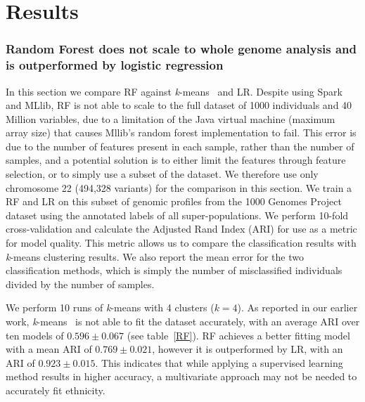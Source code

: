 \documentclass{llncs}
\newcommand{\kMeans}{\textit{k}-means }
\begin{document}
{%

\section{Results}

\subsubsection{Random Forest does not scale to whole genome analysis and is outperformed by logistic regression}
In this section we compare RF against \kMeans\ and LR.  
Despite using {\sc Spark} and {\sc MLlib}, RF is not able to scale to the full dataset of 1000 individuals and 40
Million variables, due to a limitation of the Java virtual machine (maximum array size) that causes {\sc Mllib}'s
random forest implementation to fail. This error is due to the number of features present in each sample,
rather than the number of samples, and a potential solution is to either limit the features through feature selection, or to simply use a subset of the dataset.
We therefore use only chromosome 22 (494,328 variants) for the comparison in this section.  We train a RF
and LR on this subset of genomic profiles from the 1000 Genomes Project dataset using the annotated labels of all
super-populations.  We perform 10-fold cross-validation and calculate the Adjusted Rand Index (ARI) for use as a metric for model quality.
This metric allows us to compare the classification results with \kMeans{} clustering results.
We also report the mean error for the two classification methods, which is simply the number of misclassified individuals divided by the number of samples.


We perform 10 runs of \kMeans{} with 4 clusters (\(k=4\)). As reported in our earlier work, \kMeans\ is not able to fit the dataset accurately,
with an average ARI over ten models of \(0.596 \pm 0.067\) (see table~\ref{RF}).
RF achieves a better fitting model with a mean ARI of \(0.769 \pm 0.021\), however it is outperformed by LR, with an ARI of \(0.923 \pm 0.015\).
This indicates that while applying a supervised learning method results in higher accuracy, a multivariate approach may not be needed to accurately fit ethnicity. 


}
\end{document}
